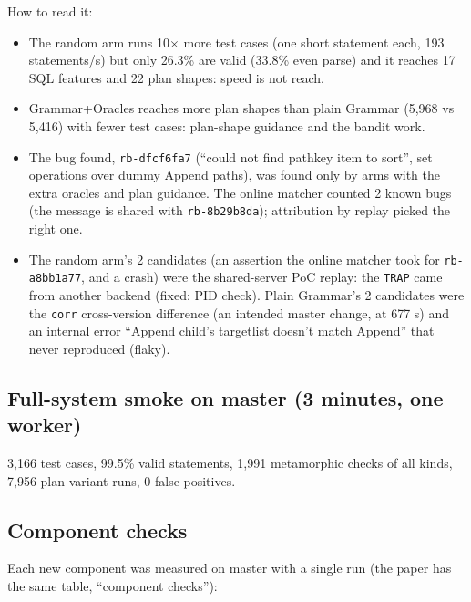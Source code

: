 How to read it:
\begin{itemize}
  \item The random arm runs 10$\times$ more test cases (one short statement
    each, 193 statements/s) but only 26.3\% are valid (33.8\% even parse) and
    it reaches 17 SQL features and 22 plan shapes: speed is not reach.
  \item Grammar+Oracles reaches more plan shapes than plain Grammar (5{,}968 vs
    5{,}416) with fewer test cases: plan-shape guidance and the bandit work.
  \item The bug found, \texttt{rb-dfcf6fa7} (``could not find pathkey item to
    sort'', set operations over dummy Append paths), was found only by arms
    with the extra oracles and plan guidance. The online matcher counted 2
    known bugs (the message is shared with \texttt{rb-8b29b8da}); attribution
    by replay picked the right one.
  \item The random arm's 2 candidates (an assertion the online matcher took
    for \texttt{rb-a8bb1a77}, and a crash) were the shared-server PoC replay:
    the \texttt{TRAP} came from another backend (fixed: PID check). Plain
    Grammar's 2 candidates were the \texttt{corr} cross-version difference
    (an intended master change, at 677 s) and an internal error ``Append
    child's targetlist doesn't match Append'' that never reproduced (flaky).
\end{itemize}

\subsection{Full-system smoke on master (3 minutes, one worker)}
3{,}166 test cases, 99.5\% valid statements, 1{,}991 metamorphic checks of all
kinds, 7{,}956 plan-variant runs, 0 false positives.

\subsection{Component checks}
\label{sec:components}

Each new component was measured on master with a single run (the paper has the
same table, ``component checks''):

